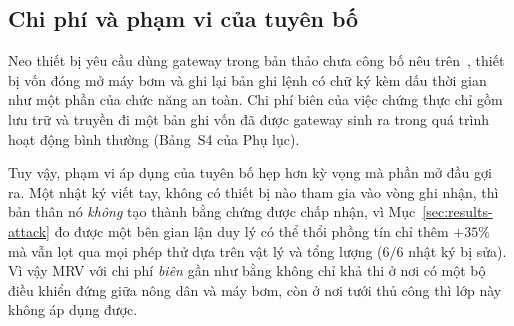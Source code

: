 \subsection{Chi phí và phạm vi của tuyên bố}

Neo thiết bị yêu cầu dùng gateway trong bản thảo chưa công bố nêu trên~\cite{twingate2026}, thiết bị vốn đóng mở máy bơm và ghi lại bản ghi lệnh có chữ ký kèm dấu thời gian
như một phần của chức năng an toàn. Chi phí biên của việc chứng thực chỉ gồm lưu trữ và truyền đi một bản ghi vốn đã được gateway sinh ra trong quá trình hoạt động bình thường (Bảng~S4 của Phụ lục).

Tuy vậy, phạm vi áp dụng của tuyên bố hẹp hơn kỳ vọng mà phần mở đầu gợi ra. Một nhật ký viết tay, không có thiết bị nào tham gia vào vòng ghi nhận, thì bản
thân nó \emph{không} tạo thành bằng chứng được chấp nhận, vì
Mục~\ref{sec:results-attack} đo được một bên gian lận duy lý có thể thổi phồng tín chỉ
thêm $+35\%$ mà vẫn lọt qua mọi phép thử dựa trên vật lý và tổng lượng ($6/6$
nhật ký bị sửa). Vì vậy MRV với chi phí \emph{biên} gần như bằng không chỉ
khả thi ở nơi có một bộ điều khiển đứng giữa nông dân và máy bơm, còn ở nơi tưới
thủ công thì lớp này không áp dụng được.
